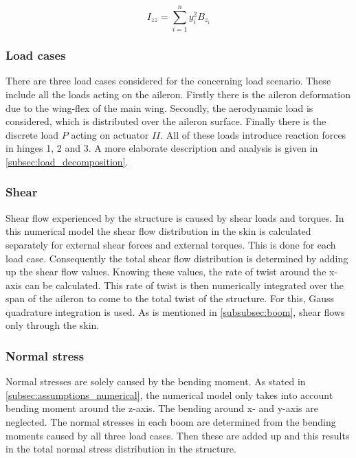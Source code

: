 \begin{equation}
\label{MoI_zz}
    I_{z z}=\sum_{i=1}^{n} y_{i}^{2} B_{z_{i}}
\end{equation}

\subsubsection{Load cases}

There are three load cases considered for the concerning load scenario. These include all the loads acting on the aileron.
Firstly there is the aileron deformation due to the wing-flex of the main wing. Secondly, the aerodynamic load is considered, which is distributed over the aileron surface. Finally there is the discrete load $P$ acting on actuator $II$. All of these loads introduce reaction forces in hinges 1, 2 and 3. A more elaborate description and analysis is given in \autoref{subsec:load_decomposition}.

\subsubsection{Shear}
Shear flow experienced by the structure is caused by shear loads and torques. In this numerical model the shear flow distribution in the skin is calculated separately for external shear forces and external torques. This is done for each load case. Consequently the total shear flow distribution is determined by adding up the shear flow values. Knowing these values, the rate of twist around the x-axis can be calculated. This rate of twist is then numerically integrated over the span of the aileron to come to the total twist of the structure. For this, Gauss quadrature integration is used.
As is mentioned in \autoref{subsubsec:boom}, shear flows only through the skin.

\subsubsection{Normal stress}
Normal stresses are solely caused by the bending moment. As stated in \autoref{subsec:assumptions_numerical}, the numerical model only takes into account bending moment around the z-axis. The bending around x- and y-axis are neglected.
The normal stresses in each boom are determined from the bending moments caused by all three load cases. Then these are added up and this results in the total normal stress distribution in the structure.

